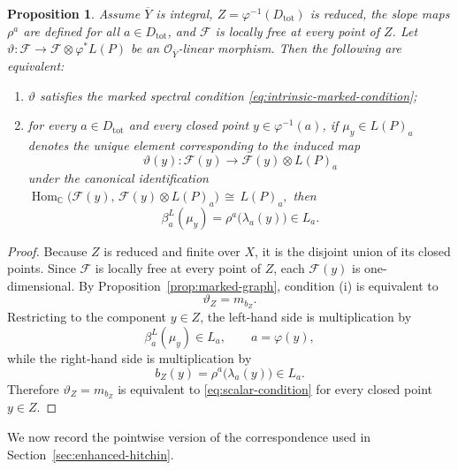 \documentclass[a4paper,12pt]{amsart}
\numberwithin{equation}{section}
\newtheorem{proposition}[theorem]{Proposition}
\theoremstyle{definition}
\newcommand{\OO}{\mathcal{O}}
\newcommand{\cF}{\mathcal{F}}
\newcommand{\Hom}{\operatorname{Hom}}
\newcommand{\CC}{\mathbb C}
\begin{document}
\begin{proposition}\label{prop:scalar}
Assume \(\overline{Y}\) is integral, \(Z=\varphi^{-1}(D_{\mathrm{tot}})\) is reduced, the slope maps \(\rho^a\) are defined for all \(a\in D_{\mathrm{tot}}\), and \(\cF\) is locally free at every point of \(Z\).  Let
\(
\vartheta:\cF\longrightarrow \cF\otimes \varphi^*L(P)
\)
be an \(\OO_{\overline{Y}}\)-linear morphism.  Then the following are equivalent:
\begin{enumerate}
\item[(i)] \(\vartheta\) satisfies the marked spectral condition \eqref{eq:intrinsic-marked-condition};
\item[(ii)] for every \(a\in D_{\mathrm{tot}}\) and every closed point \(y\in \varphi^{-1}(a)\), if
\(
\mu_y\in L(P)_a
\)
denotes the unique element corresponding to the induced map
\[
\vartheta(y):\cF(y)\longrightarrow \cF(y)\otimes L(P)_a
\]
under the canonical identification
\(
\Hom_\CC\bigl(\cF(y),\,\cF(y)\otimes L(P)_a\bigr)\,\cong\, L(P)_a,
\)
then
\begin{equation}\label{eq:scalar-condition}
\beta_a^L(\mu_y)=\rho^a\bigl(\lambda_a(y)\bigr)\in L_a.
\end{equation}
\end{enumerate}
\end{proposition}
\begin{proof}
Because \(Z\) is reduced and finite over \(X\), it is the disjoint union of its closed points.  Since \(\cF\) is locally free at every point of \(Z\), each \(\cF(y)\) is one-dimensional.  By Proposition~\ref{prop:marked-graph}, condition \textup{(i)} is equivalent to
\[
\vartheta_Z=m_{b_Z}.
\]
Restricting to the component \(y\in Z\), the left-hand side is multiplication by
\[
\beta_a^L(\mu_y)\in L_a,
\qquad a=\varphi(y),
\]
while the right-hand side is multiplication by
\[
b_Z(y)=\rho^a\bigl(\lambda_a(y)\bigr)\in L_a.
\]
Therefore \(\vartheta_Z=m_{b_Z}\) is equivalent to \eqref{eq:scalar-condition} for every closed point \(y\in Z\).
\end{proof}

We now record the pointwise version of the correspondence used in Section~\ref{sec:enhanced-hitchin}.
\end{document}
